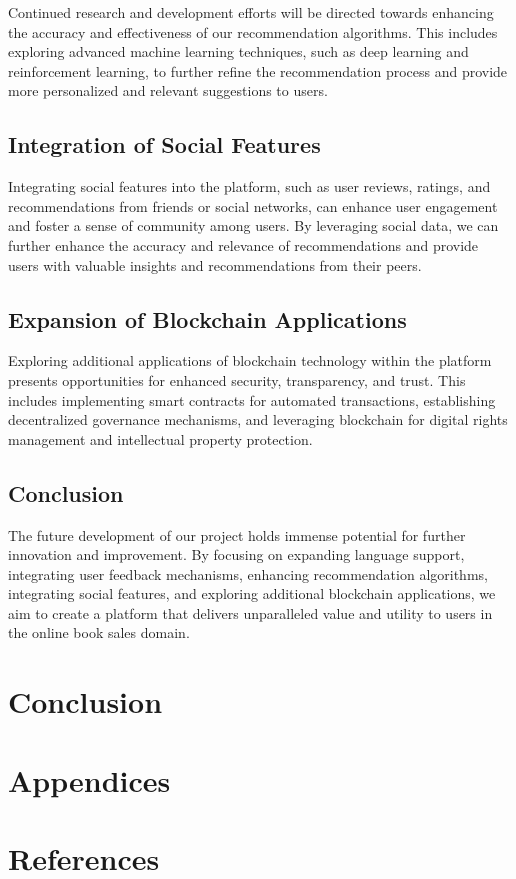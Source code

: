 \documentclass{article}
\begin{document}
Continued research and development efforts will be directed towards enhancing the accuracy and effectiveness of our recommendation algorithms. This includes exploring advanced machine learning techniques, such as deep learning and reinforcement learning, to further refine the recommendation process and provide more personalized and relevant suggestions to users.

\subsection{Integration of Social Features}

Integrating social features into the platform, such as user reviews, ratings, and recommendations from friends or social networks, can enhance user engagement and foster a sense of community among users. By leveraging social data, we can further enhance the accuracy and relevance of recommendations and provide users with valuable insights and recommendations from their peers.

\subsection{Expansion of Blockchain Applications}

Exploring additional applications of blockchain technology within the platform presents opportunities for enhanced security, transparency, and trust. This includes implementing smart contracts for automated transactions, establishing decentralized governance mechanisms, and leveraging blockchain for digital rights management and intellectual property protection.

\subsection{Conclusion}

The future development of our project holds immense potential for further innovation and improvement. By focusing on expanding language support, integrating user feedback mechanisms, enhancing recommendation algorithms, integrating social features, and exploring additional blockchain applications, we aim to create a platform that delivers unparalleled value and utility to users in the online book sales domain.


\section{Conclusion}

\section{Appendices}

\section{References}
\end{document}
